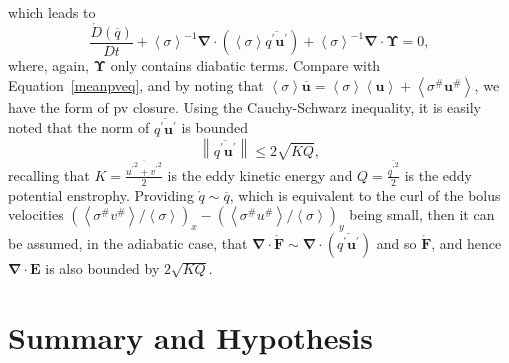 \documentclass[12pt,a4paper]{report}
\newcommand*\thkmean[1]{\overline{#1}}
\newcommand*\thkres[1]{{#1}^{\prime}}
\newcommand*\nthkmean[1]{\left\langle{#1}\right\rangle}
\newcommand*\nthkres[1]{{#1}^{\#}}
\newcommand*\spec[1]{\mathring{#1}}
\newcommand*\equref[1]{Equation~\eqref{#1}}
\begin{document}
                      which leads  to
                      \begin{equation}
                      \frac{\spec{D} \left( \thkmean{q}\right)}{D t}
                      + \nthkmean{\sigma}^{-1}\boldsymbol{\nabla}\cdot\left(\nthkmean{\sigma}\thkmean{\thkres{q} \thkres{\boldsymbol{u}}}\right)
                      +\nthkmean{\sigma}^{-1}\boldsymbol{\nabla}\cdot\boldsymbol{\Upsilon}=0 ,
                      \end{equation}
                      where, again, $\boldsymbol{\Upsilon}$ only contains
                      diabatic terms. Compare with \equref{meanpveq}, and by noting that
                       ${\nthkmean{\sigma}\thkmean{\boldsymbol{u}}=\nthkmean{\sigma}\nthkmean{\boldsymbol{u}} + \nthkmean{\nthkres{\sigma}\nthkres{\boldsymbol{u}}}}$, we have the 
                       \cite{greatbatch1998exploring} form of \gls{pv} closure.
                       Using the Cauchy-Schwarz inequality, it is easily noted that
                       the norm of $\thkmean{\thkres{q} \thkres{\boldsymbol{u}}}$ is bounded
                       \begin{equation}
                       \left\|\thkmean{\thkres{q} \thkres{\boldsymbol{u}}}\right\|
                       \leq 2\sqrt{KQ},
                       \end{equation}
                       recalling that $K = \frac{\thkmean{{\thkres{u}}^{2} +
                       	{\thkres{v}}^{2}}}{2}$ is the eddy kinetic energy and $Q =
                        \frac{\thkmean{{\thkres{q}}^{2}}}{2}$ is the eddy potential enstrophy.
                       Providing $\spec{q} \sim \thkmean{q}$, which is equivalent 
                       to the  curl of the bolus velocities $\left(\nthkmean{\nthkres{\sigma}\nthkres{v}}/\nthkmean{\sigma}\right)_{x}-\left(\nthkmean{\nthkres{\sigma}\nthkres{u}}/\nthkmean{\sigma}\right)_{y}$ 
                       being small, then it can be assumed, in the adiabatic case,
                       that $\boldsymbol{\nabla}\cdot\spec{\boldsymbol{F}} \sim \boldsymbol{\nabla}\cdot\left(\thkmean{\thkres{q} \thkres{\boldsymbol{u}}}\right)$ and so $\spec{\boldsymbol{F}}$,
                       and hence $\boldsymbol{\nabla}\cdot\boldsymbol{E}$
                       is also bounded by  $2\sqrt{KQ}$.
                       
                       
                     


\section{Summary and Hypothesis}
\end{document}
